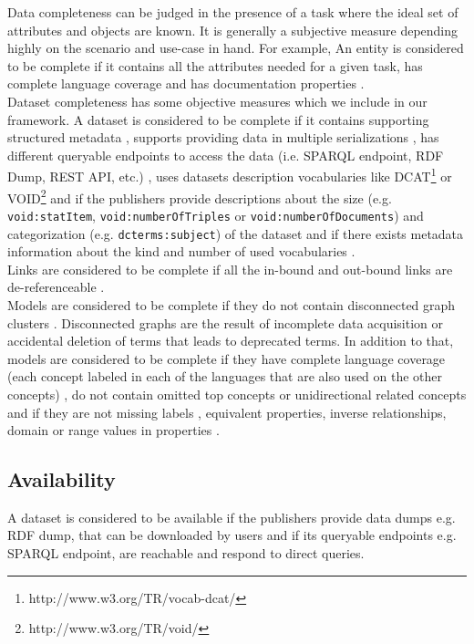 \documentclass[onecolumn, crcready]{iosart2c}
\begin{document}
Data completeness can be judged in the presence of a task where the ideal set of attributes and objects are known. It is generally a subjective measure depending highly on the scenario and use-case in hand. For example, An entity is considered to be complete if it contains all the attributes needed for a given task, has complete language coverage \cite{Mader2012} and has documentation properties \cite{w3c_skos_rec}\cite{Mader2012}.\\
Dataset completeness has some objective measures which we include in our framework. A dataset is considered to be complete if it contains supporting structured metadata \cite{Hogan2010}, supports providing data in multiple serializations \cite{Framework2012}, has different queryable endpoints to access the data (i.e. SPARQL endpoint, RDF Dump, REST API, etc.) \cite{Framework2012}, uses datasets description vocabularies like DCAT\footnote{http://www.w3.org/TR/vocab-dcat/} or VOID\footnote{http://www.w3.org/TR/void/} and if the publishers provide descriptions about the size (e.g. \texttt{void:statItem}, \texttt{void:numberOfTriples} or \texttt{void:numberOfDocuments}) and categorization (e.g. \texttt{dcterms:subject}) of the dataset and if there exists metadata information about the kind and number of used vocabularies \cite{Framework2012}.\\
Links are considered to be complete if all the in-bound and out-bound links are de-referenceable \cite{Hogan2010}\cite{Mader2012}\cite{Gueret2012}.\\
Models are considered to be complete if they do not contain disconnected graph clusters \cite{Mader2012}. Disconnected graphs are the result of incomplete data acquisition or accidental deletion of terms that leads to deprecated terms. In addition to that, models are considered to be complete if they have complete language coverage (each concept labeled in each of the languages that are also used on the other concepts) \cite{Mader2012}, do not contain omitted top concepts or unidirectional related concepts \cite{Hogan2010} and if they are not missing labels \cite{Mader2012}, equivalent properties, inverse relationships, domain or range values in properties \cite{DBLP:conf/ic3k/KeetSP13}.

\subsection{Availability}

A dataset is considered to be available if the publishers provide data dumps e.g. RDF dump, that can be downloaded by users \cite{flemming2010}\cite{Hogan2010} and if its queryable endpoints e.g. SPARQL endpoint, are reachable and respond to direct queries.
\end{document}
